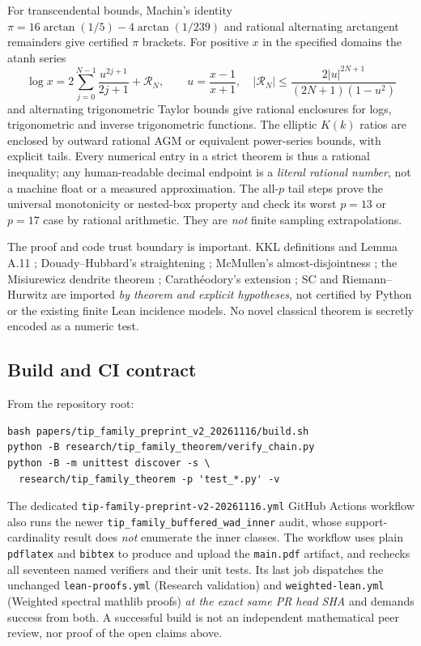 For transcendental
bounds, Machin's
identity
$\pi=16\arctan(1/5)
-4\arctan(1/239)$
and rational
alternating arctangent
remainders give
certified $\pi$
brackets.
For positive
$x$ in the
specified domains
the atanh series
\[
 \log x=2\sum_{j=0}^{N-1}
 \frac{u^{2j+1}}{2j+1}
 +\mathcal{R}_N,\qquad
 u=\frac{x-1}{x+1},\quad
 |\mathcal{R}_N|\le
 \frac{2|u|^{2N+1}}
 {(2N+1)(1-u^2)}
\]
and alternating
trigonometric
Taylor bounds
give rational
enclosures for
logs, trigonometric
and inverse
trigonometric
functions.
The elliptic
$K(k)$ ratios
are enclosed by
outward rational
AGM or equivalent
power-series
bounds, with
explicit tails.
Every numerical
entry in a
strict theorem
is thus a
rational
inequality;
any human-readable
decimal endpoint
is a \emph{literal
rational number},
not a machine
float or a
measured approximation.
The all-$p$
tail steps
prove the
universal
monotonicity
or nested-box
property and
check its
worst $p=13$
or $p=17$
case by
rational
arithmetic.
They are
\emph{not}
finite sampling
extrapolations.

The proof
and code
trust boundary
is important.
KKL definitions
and Lemma A.11
\cite{KKL2026};
Douady--Hubbard's
straightening
\cite{DH1985};
McMullen's
almost-disjointness
\cite{McMullen1994};
the Misiurewicz
dendrite theorem
\cite{LyubichNotes};
Carath\'eodory's
extension
\cite{Caratheodory1913};
SC and
Riemann--Hurwitz
\cite{AhlforsInvariants,Forster1981}
are imported
\emph{by theorem
and explicit
hypotheses},
not certified
by Python or
the existing
finite Lean
incidence
models.
No novel
classical
theorem is
secretly
encoded as
a numeric
test.

\subsection{Build and CI contract}
From the
repository root:
\begin{verbatim}
bash papers/tip_family_preprint_v2_20261116/build.sh
python -B research/tip_family_theorem/verify_chain.py
python -B -m unittest discover -s \
  research/tip_family_theorem -p 'test_*.py' -v
\end{verbatim}
The dedicated
\texttt{tip-family-preprint-v2-20261116.yml}
GitHub Actions workflow also runs
the newer \texttt{tip\_family\_buffered\_wad\_inner}
audit, whose support-cardinality result
does \emph{not} enumerate the inner classes.
The workflow uses
plain
\texttt{pdflatex}
and \texttt{bibtex}
to produce and
upload the
\texttt{main.pdf}
artifact, and
rechecks all
seventeen named
verifiers and
their unit
tests.  Its
last job
dispatches the
unchanged
\texttt{lean-proofs.yml}
(Research validation)
and
\texttt{weighted-lean.yml}
(Weighted spectral
mathlib proofs)
\emph{at the
exact same
PR head SHA}
and demands
success from
both.  A
successful
build is not
an independent
mathematical
peer review,
nor proof of
the open
claims above.
